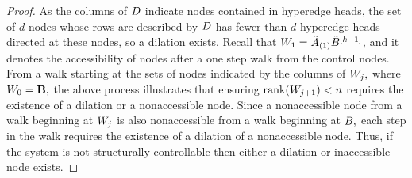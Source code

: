 \documentclass[10pt,a4paper]{amsart}
\newcommand{\Bv}{\mathbf{B}}
\newcommand{\rank}{\text{rank}}
\begin{document}
\begin{proof}
        
        As the columns of $\textbf D$ indicate nodes contained in hyperedge heads, the set of $d$ nodes whose rows are described by $\textbf D$ has fewer than $d$ hyperedge heads directed at these nodes, so a dilation exists. Recall that $\textbf W_1=\tilde{\textbf A}_{(1)}\tilde{\textbf B}^{[k-1]}$, and it denotes the accessibility of nodes after a one step walk from the control nodes.
    From a walk starting at the sets of nodes indicated by the columns of $\textbf W_j,$ where $\textbf W_0=\Bv,$ the above process illustrates that ensuring $\rank(\textbf W_{j+1})<n$ requires the existence of a dilation or a nonaccessible node.
    Since a nonaccessible node from a walk beginning at $\textbf W_j$ is also nonaccessible from a walk beginning at $\textbf B,$ each step in the walk requires the existence of a dilation of a nonaccessible node.
    Thus, if the system is not structurally controllable then either a dilation or inaccessible node exists.
\end{proof}
\end{document}
